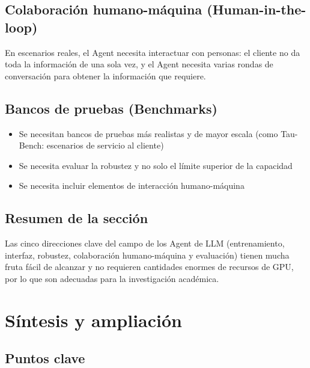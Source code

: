 \documentclass[a4paper]{article}
\begin{document}
\subsection{Colaboración humano-máquina (Human-in-the-loop)}

En escenarios reales, el Agent necesita interactuar con personas: el cliente no da toda la información de una sola vez, y el Agent necesita varias rondas de conversación para obtener la información que requiere.

\subsection{Bancos de pruebas (Benchmarks)}

\begin{itemize}
    \item Se necesitan bancos de pruebas más realistas y de mayor escala (como Tau-Bench: escenarios de servicio al cliente)
    \item Se necesita evaluar la robustez y no solo el límite superior de la capacidad
    \item Se necesita incluir elementos de interacción humano-máquina
\end{itemize}

\subsection{Resumen de la sección}

Las cinco direcciones clave del campo de los Agent de LLM (entrenamiento, interfaz, robustez, colaboración humano-máquina y evaluación) tienen mucha fruta fácil de alcanzar y no requieren cantidades enormes de recursos de GPU, por lo que son adecuadas para la investigación académica.

\section{Síntesis y ampliación}

\subsection{Puntos clave}
\end{document}

